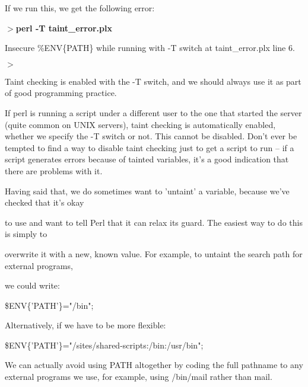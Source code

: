 \documentclass[a4paper,11pt]{book}
\begin{document}
\noindent 

\noindent If we run this, we get the following error:

\noindent 

\noindent $>$\textbf{perl -T taint\_error.plx}

\noindent Insecure \%ENV\{PATH\} while running with -T switch at taint\_error.plx line 6.

\noindent $>$

\noindent 

\noindent Taint checking is enabled with the -T switch, and we should always use it as part of good programming practice.

\noindent 

\noindent If perl is running a script under a different user to the one that started the server (quite common on UNIX servers), taint checking is automatically enabled, whether we specify the -T switch or not. This cannot be disabled. Don't ever be tempted to find a way to disable taint checking just to get a script to run -- if a script generates errors because of tainted variables, it's a good indication that there are problems with it.

\noindent 

\noindent 

\noindent Having  said that, we do  sometimes  want  to  'untaint'  a  variable,  because  we've  checked  that it's okay

\noindent to  use and want to  tell Perl that  it  can  relax  its  guard.  The  easiest  way  to  do  this is  simply  to

\noindent overwrite it with a new,  known  value.  For  example,  to  untaint  the  search  path  for external programs,

\noindent we could write:

\noindent 

\noindent 

\noindent \$ENV\{'PATH'\}="/bin";

\noindent 

\noindent Alternatively, if we have to be more flexible:

\noindent 

\noindent 

\noindent \$ENV\{'PATH'\}="/sites/shared-scripts:/bin:/usr/bin";

\noindent 

\noindent We can actually avoid using PATH altogether by coding the full pathname to any external programs we use, for example, using /bin/mail rather than mail.
\end{document}
